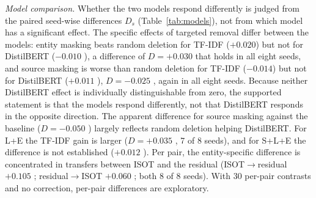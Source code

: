\emph{Model comparison.} Whether the two models respond differently is judged from the paired seed-wise differences $D_s$ (Table~\ref{tab:models}), not from which model has a significant effect. The specific effects of targeted removal differ between the models: entity masking beats random deletion for TF-IDF ($+0.020$) but not for DistilBERT ($-0.010$ ), a difference of $D=+0.030$  that holds in all eight seeds, and source masking is worse than random deletion for TF-IDF ($-0.014$) but not for DistilBERT ($+0.011$ ), $D=-0.025$ , again in all eight seeds. Because neither DistilBERT effect is individually distinguishable from zero, the supported statement is that the models respond differently, not that DistilBERT responds in the opposite direction. The apparent difference for source masking against the baseline ($D=-0.050$ ) largely reflects random deletion helping DistilBERT. For L+E the TF-IDF gain is larger ($D=+0.035$ , 7 of 8 seeds), and for S+L+E the difference is not established ($+0.012$ ). Per pair, the entity-specific difference is concentrated in transfers between ISOT and the residual (ISOT$\rightarrow$residual $+0.105$ ; residual$\rightarrow$ISOT $+0.060$ ; both 8 of 8 seeds). With 30 per-pair contrasts and no correction, per-pair differences are exploratory.

\begin{table}[t]
\caption{Archived protocol: Model comparison, cross-dataset AUC: pooled effect of each contrast for each model and the paired seed-wise difference $D=$ TF-IDF $-$ DistilBERT (mean and 95\% interval over eight seeds).}
\label{tab:models}
\centering\scriptsize\setlength{\tabcolsep}{2pt}
\end{table}

